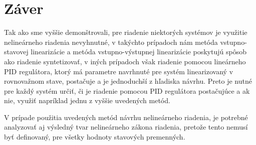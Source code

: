 \newpage
{}
{
	\section{Záver}
    Tak ako sme vyššie demonštrovali, pre riadenie niektorých systémov je využitie nelineárneho riadenia nevyhnutné, v takýchto prípadoch nám metóda vstupno-stavovej linearizácie a metóda vstupno-výstupnej linearizácie poskytujú spôsob ako riadenie syntetizovať, v iných prípadoch však riadenie pomocou lineárneho PID regulátora, ktorý má parametre navrhnuté pre systém linearizovaný v rovnovažnom stave, postačuje a je jednoduchší z hľadiska návrhu. Preto je nutné pre každý systém určiť, či je riadenie pomocou PID regulátora postačujúce a ak nie, využiť napríklad jednu z vyššie uvedených metód.

    V prípade použitia uvedených metód návrhu nelineárneho riadenia, je potrebné analyzovať aj výsledný tvar nelineárneho zákona riadenia, pretože tento nemusí byť definovaný, pre všetky hodnoty stavových premenných.
}

